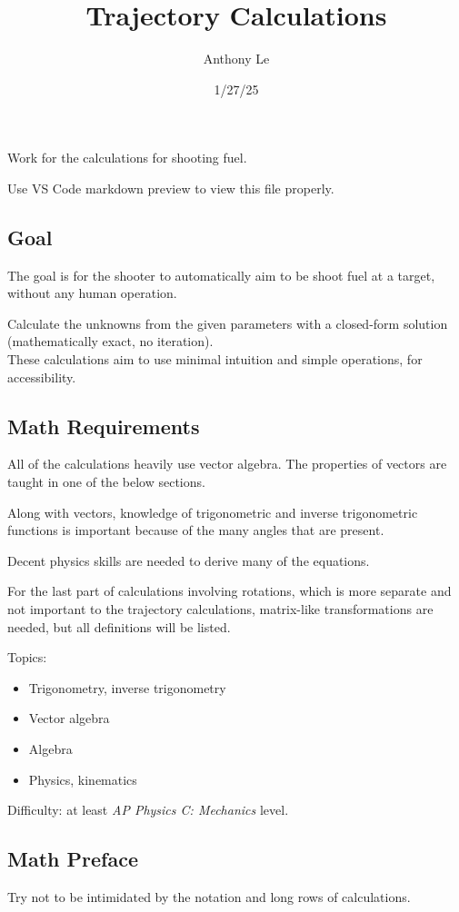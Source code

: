 \documentclass{article}
\begin{document}
\title{Trajectory Calculations}
\author{Anthony Le}
\date{1/27/25}
\maketitle

Work for the calculations for shooting fuel.

Use VS Code markdown preview to view this file properly.

\subsection*{Goal}
The goal is for the shooter to automatically aim to be shoot fuel at a target, without any human operation.

Calculate the unknowns from the given parameters with a closed-form solution (mathematically exact, no iteration). \\
These calculations aim to use minimal intuition and simple operations, for accessibility.

\subsection*{Math Requirements}
All of the calculations heavily use vector algebra. The properties of vectors are taught in one of the below sections.

Along with vectors, knowledge of trigonometric and inverse trigonometric functions is important because of the many angles that are present.

Decent physics skills are needed to derive many of the equations.

For the last part of calculations involving rotations, which is more separate and not important to the trajectory calculations, matrix-like transformations are needed, but all definitions will be listed.

Topics:
\begin{itemize}
    \item Trigonometry, inverse trigonometry
    \item Vector algebra
    \item Algebra
    \item Physics, kinematics
\end{itemize}

Difficulty: at least \textit{AP Physics C: Mechanics} level.

\subsection*{Math Preface}
Try not to be intimidated by the notation and long rows of calculations.
\end{document}
